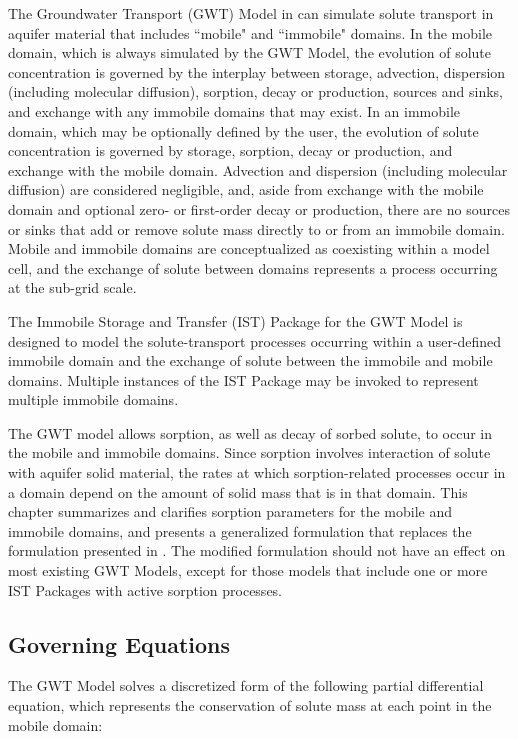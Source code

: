 
The Groundwater Transport (GWT) Model \citep{modflow6gwt} in \mf can simulate solute transport in aquifer material that includes ``mobile" and ``immobile" domains. In the mobile domain, which is always simulated by the GWT Model, the evolution of solute concentration is governed by the interplay between storage, advection, dispersion (including molecular diffusion), sorption, decay or production, sources and sinks, and exchange with any immobile domains that may exist. In an immobile domain, which may be optionally defined by the user, the evolution of solute concentration is governed by storage, sorption, decay or production, and exchange with the mobile domain. Advection and dispersion (including molecular diffusion) are considered negligible, and, aside from exchange with the mobile domain and optional zero- or first-order decay or production, there are no sources or sinks that add or remove solute mass directly to or from an immobile domain. Mobile and immobile domains are conceptualized as coexisting within a model cell, and the exchange of solute between domains represents a process occurring at the sub-grid scale.

The Immobile Storage and Transfer (IST) Package \citep{modflow6gwt} for the GWT Model is designed to model the solute-transport processes occurring within a user-defined immobile domain and the exchange of solute between the immobile and mobile domains. Multiple instances of the IST Package may be invoked to represent multiple immobile domains.

The GWT model allows sorption, as well as decay of sorbed solute, to occur in the mobile and immobile domains. Since sorption involves interaction of solute with aquifer solid material, the rates at which sorption-related processes occur in a domain depend on the amount of solid mass that is in that domain. This chapter summarizes and clarifies sorption parameters for the mobile and immobile domains, and presents a generalized formulation that replaces the formulation presented in \cite{modflow6gwt}.  The modified formulation should not have an effect on most existing GWT Models, except for those models that include one or more IST Packages with active sorption processes.

\subsection{Governing Equations} \label{sec:goveqn1}

The GWT Model \citep{modflow6gwt} solves a discretized form of the following partial differential equation, which represents the conservation of solute mass at each point in the mobile domain:

